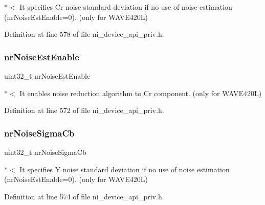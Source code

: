 $\ast$$<$ It specifies Cr noise standard deviation if no use of noise estimation (nr\+Noise\+Est\+Enable=0). (only for W\+A\+V\+E420L) 

Definition at line 578 of file ni\+\_\+device\+\_\+api\+\_\+priv.\+h.

\mbox{\label{struct__ni__encoder__change__params__t_a7bac97c4d1967ed8c31034e3c402e31f}} 
\subsubsection{\texorpdfstring{nrNoiseEstEnable}{nrNoiseEstEnable}}
{\footnotesize\ttfamily uint32\+\_\+t nr\+Noise\+Est\+Enable}

$\ast$$<$ It enables noise reduction algorithm to Cr component. (only for W\+A\+V\+E420L) 

Definition at line 572 of file ni\+\_\+device\+\_\+api\+\_\+priv.\+h.

\mbox{\label{struct__ni__encoder__change__params__t_a551fcc5ea682e36c1fe82833645cbeba}} 
\subsubsection{\texorpdfstring{nrNoiseSigmaCb}{nrNoiseSigmaCb}}
{\footnotesize\ttfamily uint32\+\_\+t nr\+Noise\+Sigma\+Cb}

$\ast$$<$ It specifies Y noise standard deviation if no use of noise estimation (nr\+Noise\+Est\+Enable=0). (only for W\+A\+V\+E420L) 

Definition at line 574 of file ni\+\_\+device\+\_\+api\+\_\+priv.\+h.

\mbox{\label{struct__ni__encoder__change__params__t_a273b9f2be635c0d0531f0f5cb224bc04}} 

